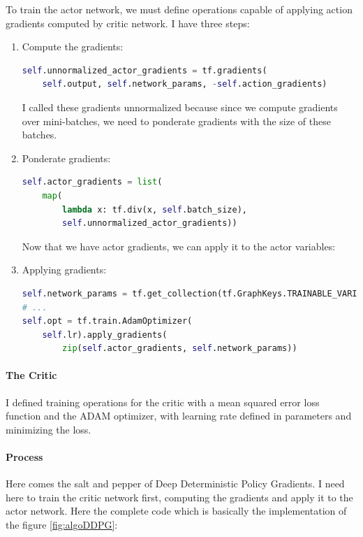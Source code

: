 \documentclass{article}
\begin{document}
To train the actor network, we must define operations capable of applying action
gradients computed by critic network. I have three steps:
\begin{enumerate}
\item Compute the gradients:
\begin{lstlisting}[language=Python]
self.unnormalized_actor_gradients = tf.gradients(
    self.output, self.network_params, -self.action_gradients)
\end{lstlisting}
  I called these gradients unnormalized because since we compute gradients over
  mini-batches, we need to ponderate gradients with the size of these batches.
\item Ponderate gradients:
\begin{lstlisting}[language=Python]
self.actor_gradients = list(
    map(
        lambda x: tf.div(x, self.batch_size),
        self.unnormalized_actor_gradients))
\end{lstlisting}
  Now that we have actor gradients, we can apply it to the actor variables:
\item Applying gradients:
\begin{lstlisting}[language=Python]
self.network_params = tf.get_collection(tf.GraphKeys.TRAINABLE_VARIABLES, scope=self.scope+"/model")
# ...
self.opt = tf.train.AdamOptimizer(
    self.lr).apply_gradients(
        zip(self.actor_gradients, self.network_params))
\end{lstlisting}
\end{enumerate}

\paragraph{The Critic}

I defined training operations for the critic with a mean squared error loss
function and the ADAM optimizer, with learning rate defined in parameters and
minimizing the loss.

\paragraph{Process}
Here comes the salt and pepper of Deep Deterministic Policy Gradients. I need
here to train the critic network first, computing the gradients and apply it to
the actor network. Here the complete code which is basically the implementation
of the figure \ref{fig:algoDDPG}:
\end{document}
